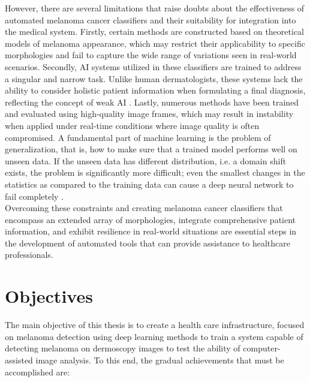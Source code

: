 However, there are several limitations that raise doubts about the
effectiveness of automated melanoma cancer classifiers and their suitability
for integration into the medical system. Firstly, certain methods are
constructed based on theoretical models of melanoma appearance, which may
restrict their applicability to specific morphologies and fail to capture the
wide range of variations seen in real-world scenarios. Secondly, AI systems
utilized in these classifiers are trained to address a singular and narrow
task. Unlike human dermatologists, these systems lack the ability to consider
holistic patient information when formulating a final diagnosis, reflecting the
concept of weak AI \cite{WeakAI}. Lastly, numerous methods have been trained
and evaluated using high-quality image frames, which may result in instability
when applied under real-time conditions where image quality is often
compromised. A fundamental part of machine learning is the problem of
generalization, that is, how to make sure that a trained model performs well on
unseen data. If the unseen data has different distribution, i.e. a domain shift
exists, the problem is significantly more difficult; even the smallest changes
in the statistics as compared to the training data can cause a deep neural
network to fail completely \cite{DomainShift}. \\

Overcoming these constraints and creating melanoma cancer classifiers that
encompass an extended array of morphologies, integrate comprehensive patient
information, and exhibit resilience in real-world situations are essential
steps in the development of automated tools that can provide assistance to
healthcare professionals.

\section{Objectives}

The main objective of this thesis is to create a health care infrastructure,
focused on melanoma detection using deep learning methods to train a system
capable of detecting melanoma on dermoscopy images to test the ability of
computer-assisted image analysis. To this end, the gradual achievements that
must be accomplished are:

